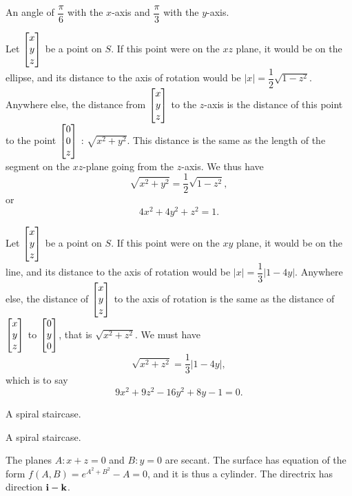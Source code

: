 \begin{Answer}{3.26}
An angle of $ \dfrac{\pi}{6}$ with the $x$-axis and $
\dfrac{\pi}{3}$ with the $y$-axis.
\end{Answer}
\begin{Answer}{5.1}
 Let $\begin{bmatrix} x\\ y\\ z \end{bmatrix}$ be a point on $S$. If this point were on
the $xz$ plane, it would be on the ellipse, and its distance to the
axis of rotation would be $|x| = \dfrac{1}{2}\sqrt{1 -
z^2}$. Anywhere else, the distance from $\begin{bmatrix} x\\ y\\
z \end{bmatrix}$ to the $z$-axis  is the distance of this point to the point
$\begin{bmatrix} 0\\ 0\\ z \end{bmatrix}$ : $\sqrt{x^2 + y^2}$. This distance is the
same as the length of the segment on the $xz$-plane going from the
$z$-axis. We thus have
$$ \sqrt{x^2 + y^2} = \dfrac{1}{2}\sqrt{1 -
z^2},$$or
$$4x^2 + 4y^2 + z^2 = 1.$$
\end{Answer}
\begin{Answer}{5.2}
 Let $\begin{bmatrix} x\\ y\\ z \end{bmatrix}$ be a point on $S$. If this point were on the
$xy$ plane, it would be on the line, and its distance to the axis of
rotation would be $|x| = \dfrac{1}{3}|1 - 4y|$. Anywhere else, the
distance of $\begin{bmatrix} x\\ y\\ z \end{bmatrix}$ to the axis of rotation is the
same as the distance of $\begin{bmatrix} x\\ y\\ z \end{bmatrix}$ to $\begin{bmatrix} 0\\
y \\ 0 \end{bmatrix}$, that is $\sqrt{x^2 + z^2}$. We must have
$$\sqrt{x^2 + z^2} = \dfrac{1}{3}|1 - 4y|, $$which is to say
$$9x^2 + 9z^2 - 16y^2 + 8y - 1 = 0.$$
\end{Answer}
\begin{Answer}{5.3}
A spiral staircase.
\end{Answer}
\begin{Answer}{5.4}
A spiral staircase.
\end{Answer}
\begin{Answer}{5.6}
 The planes $A: x + z = 0$ and $B: y = 0$ are secant. The
surface has equation of the form $f(A, B) = e^{A^2 + B^2} - A = 0$,
and it is thus a cylinder.  The directrix has direction $\mathbf{ i}
- \mathbf{ k}$.
\end{Answer}
